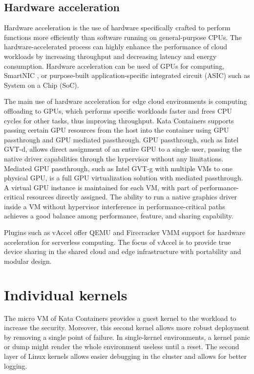 \subsection{Hardware acceleration}

Hardware acceleration is the use of hardware specifically crafted to perform functions more efficiently than software running on general-purpose CPUs. The hardware-accelerated process can highly enhance the performance of cloud workloads by increasing throughput and decreasing latency and energy consumption. Hardware acceleration can be used of GPUs for computing, SmartNIC \cite{SmartNICIntel}, or purpose-built application-specific integrated circuit (ASIC) such as System on a Chip (SoC).

The main use of hardware acceleration for edge cloud environments is computing offloading to GPUs, which performs specific workloads faster and frees CPU cycles for other tasks, thus improving throughput. Kata Containers supports passing certain GPU resources from the host into the container using GPU passthrough and GPU mediated passthrough. GPU passthrough, such as Intel GVT-d, allows direct assignment of an entire GPU to a single user, passing the native driver capabilities through the hypervisor without any limitations. Mediated GPU passthrough, such as Intel GVT-g with multiple VMs to one physical GPU, is a full GPU virtualization solution with mediated passthrough. A virtual GPU instance is maintained for each VM, with part of performance-critical resources directly assigned. The ability to run a native graphics driver inside a VM without hypervisor interference in performance-critical paths achieves a good balance among performance, feature, and sharing capability. \cite{GPUKataContainers}

Plugins such as vAccel \cite{vAccel} offer QEMU and Firecracker VMM support for hardware acceleration for serverless computing. The focus of vAccel is to provide true device sharing in the shared cloud and edge infrastructure with portability and modular design.
		
\section{Individual kernels}

The micro VM of Kata Containers provides a guest kernel to the workload to increase the security. Moreover, this second kernel allows more robust deployment by removing a single point of failure. In single-kernel environments, a kernel panic or dump might render the whole environment useless until a reset. The second layer of Linux kernels allows easier debugging in the cluster and allows for better logging.

